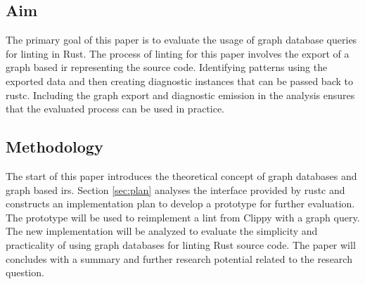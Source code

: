 \subsection{Aim} \label{sec:intro.aim}

The primary goal of this paper is to evaluate the usage of graph database queries for linting in Rust. The process of linting for this paper involves the export of a graph based \acrlong{ir} representing the source code. Identifying patterns using the exported data and then creating diagnostic instances that can be passed back to rustc. Including the graph export and diagnostic emission in the analysis ensures that the evaluated process can be used in practice.

\subsection{Methodology}

The start of this paper introduces the theoretical concept of graph databases and graph based \acrlong{ir}s. Section \ref{sec:plan} analyses the interface provided by rustc and constructs an implementation plan to develop a prototype for further evaluation. The prototype will be used to reimplement a lint from Clippy with a graph query. The new implementation will be analyzed to evaluate the simplicity and practicality of using graph databases for linting Rust source code. The paper will concludes with a summary and further research potential related to the research question.
